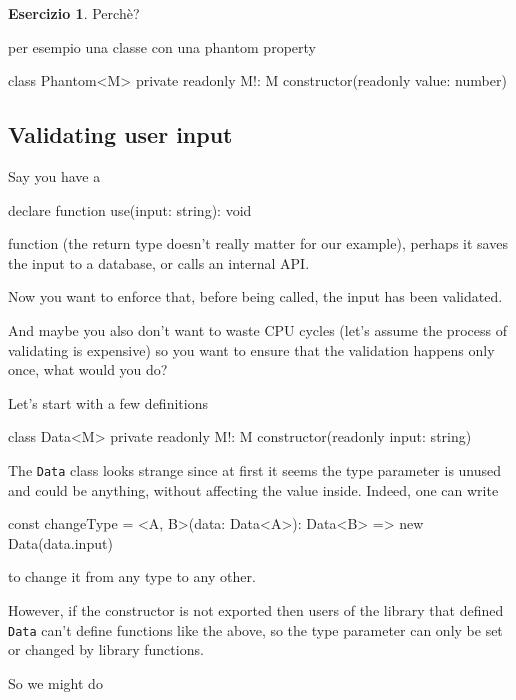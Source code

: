 \documentclass[12pt]{article}
\theoremstyle{definition}
\newtheorem{exercise}{Esercizio}[subsection]
\newenvironment{code}
  {\vspace{0.5cm} \VerbatimEnvironment\begin{typescriptcode}}
  {\end{typescriptcode} \vspace{0.2cm}}
\begin{document}
\begin{exercise}
Perchè?
\end{exercise}

per esempio una classe con una phantom property

\begin{code}
class Phantom<M> {
  private readonly M!: M
  constructor(readonly value: number) {}
}
\end{code}

\subsection{Validating user input}

Say you have a

\begin{code}
declare function use(input: string): void
\end{code}

function (the return type doesn't really matter for our example),
perhaps it saves the input to a database, or calls an internal API.

Now you want to enforce that, before being called, the input has been validated.

And maybe you also don't want to waste CPU cycles (let's assume the process of validating is expensive)
so you want to ensure that the validation happens only once, what would you do?

Let's start with a few definitions

\begin{code}
class Data<M> {
  private readonly M!: M
  constructor(readonly input: string) {}
}
\end{code}

The \texttt{Data} class looks strange since at first it seems the type parameter is unused and could be anything,
without affecting the value inside. Indeed, one can write

\begin{code}
const changeType = <A, B>(data: Data<A>): Data<B> =>
  new Data(data.input)
\end{code}

to change it from any type to any other.

However, if the constructor is not exported then users of the library that defined \texttt{Data} can't define functions like the above,
so the type parameter can only be set or changed by library functions.

So we might do
\end{document}
